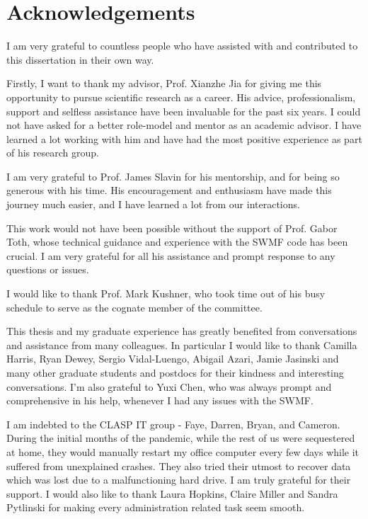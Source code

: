 \chapter{Acknowledgements}

I am very grateful to countless people who have assisted with and contributed to this dissertation in their own way.

Firstly, I want to thank my advisor, Prof. Xianzhe Jia for giving me this opportunity to pursue scientific research as a career. His advice, professionalism, support and selfless assistance have been invaluable for the past six years. I could not have asked for a better role-model and mentor as an academic advisor. I have learned a lot working with him and have had the most positive experience as part of his research group. 

I am very grateful to Prof. James Slavin for his mentorship, and for being so generous with his time. His encouragement and enthusiasm have made this journey much easier, and I have learned a lot from our interactions. 

This work would not have been possible without the support of Prof. Gabor Toth, whose technical guidance and experience with the SWMF code has been crucial. I am very grateful for all his assistance and prompt response to any questions or issues.

I would like to thank Prof. Mark Kushner, who took time out of his busy schedule to serve as the cognate member of the committee. 

This thesis and my graduate experience has greatly benefited from conversations and assistance from many colleagues. In particular I would like to thank Camilla Harris, Ryan Dewey, Sergio Vidal-Luengo, Abigail Azari, Jamie Jasinski and many other graduate students and postdocs for their kindness and interesting conversations. I'm also grateful to Yuxi Chen, who was always prompt and comprehensive in his help, whenever I had any issues with the SWMF.  

I am indebted to the CLASP IT group - Faye, Darren, Bryan, and Cameron. During the initial months of the pandemic, while the rest of us were sequestered at home, they would manually restart my office computer every few days while it suffered from unexplained crashes. They also tried their utmost to recover data which was lost due to a malfunctioning hard drive. I am truly grateful for their support. I would also like to thank Laura Hopkins, Claire Miller and Sandra Pytlinski for making every administration related task seem smooth. 

